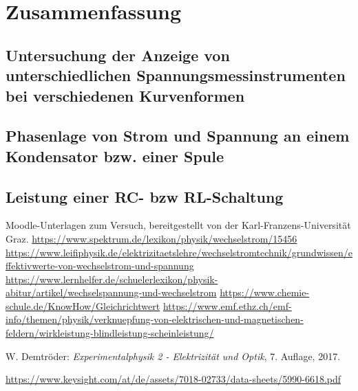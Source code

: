 \documentclass{article}
\begin{document}
\section{Zusammenfassung}

\subsection{Untersuchung  der  Anzeige  von  unterschiedlichen  Spannungsmessinstrumenten  bei verschiedenen Kurvenformen }






\subsection{Phasenlage von Strom und Spannung an einem Kondensator bzw. einer Spule}


\subsection{Leistung einer RC- bzw RL-Schaltung}




\begin{thebibliography}{9}
 Moodle-Unterlagen zum Versuch, bereitgestellt von der Karl-Franzens-Universität Graz.
 \url{https://www.spektrum.de/lexikon/physik/wechselstrom/15456}
 \url{https://www.leifiphysik.de/elektrizitaetslehre/wechselstromtechnik/grundwissen/effektivwerte-von-wechselstrom-und-spannung}
 \url{https://www.lernhelfer.de/schuelerlexikon/physik-abitur/artikel/wechselspannung-und-wechselstrom}
 \url{https://www.chemie-schule.de/KnowHow/Gleichrichtwert}
 \url{https://www.emf.ethz.ch/emf-info/themen/physik/verknuepfung-von-elektrischen-und-magnetischen-feldern/wirkleistung-blindleistung-scheinleistung/}

 W. Demtröder: \emph{Experimentalphysik 2 - Elektrizität  und Optik}, 7. Auflage, 2017.

 \url{https://www.keysight.com/at/de/assets/7018-02733/data-sheets/5990-6618.pdf}
\end{thebibliography}





%

%


%
\end{document}
